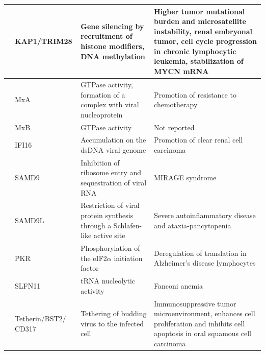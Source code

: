\documentclass{enslyonreview}
\begin{document}
\begin{table}[!t]
\begin{tabularx}{\textwidth}{|>{\justifying\parindent0pt\arraybackslash}p{2.6cm}|>{\justifying\parindent0pt\arraybackslash}p{2.7cm}|>{\justifying\parindent0pt\arraybackslash}p{3.6cm}|>{\justifying\parindent0pt\arraybackslash}X|}
      & KAP1/TRIM28 \cite{xuIFI16PartnersKAP12022,leeCharacterizationInteractionTrim282018,shangSystematicPancancerAnalysis2023,whitworthWilmsTumourResulting2024,wuPhosphoproteomicsRevealsRole2022,yangKAP1StabilizesMYCN2024} & Gene silencing by recruitment of histone modifiers, DNA methylation & Higher tumor mutational burden and microsatellite instability, renal embryonal tumor, cell cycle progression in chronic lymphocytic leukemia, stabilization of MYCN mRNA \\
      \cline{2-4}
      & MxA \cite{turanNuclearMxAProteins2004,hayesExpressionMxAEsophageal2024,liExpressionMxAProtein2020} & GTPase activity, formation of a complex with viral nucleoprotein & Promotion of resistance to chemotherapy \\
      \cline{2-4}
      & MxB \cite{xieMxBImpedesNUP358mediated2020,wangInterferoninducibleMX2Host2020,schillingHumanMxBProtein2018} & GTPase activity & Not reported \\
      \cline{2-4}
      & IFI16 \cite{luIFI16PromotesProgression2024,xuIFI16PartnersKAP12022,howardNuclearDNASensor2022,johnsonIFI16RestrictsHSV12014} & Accumulation on the dsDNA viral genome & Promotion of clear renal cell carcinoma \\
    \hline
    \multirow{4}{2.6cm}{Translation inhibition}
      & SAMD9 \cite{mengParalogousPairMammalian2018,sivanHumanHostRange2018,suntharalinghamEmergingPhenotypesLinked2022} & Inhibition of ribosome entry and sequestration of viral RNA & MIRAGE syndrome \\
      \cline{2-4}
      & SAMD9L \cite{russellSAMD9LAutoinflammatoryAtaxia2021,mengParalogousPairMammalian2018,legrandSAMD9LActsAntiviral2024} & Restriction of viral protein synthesis through a Schlafen-like active site & Severe autoinflammatory disease and ataxia-pancytopenia \\
      \cline{2-4}
      & PKR \cite{morelPKRDoubleStranded2009,manjunathAPOBEC3BDrivesPKRmediated2023} & Phosphorylation of the eIF2$\alpha$ initiation factor & Deregulation of translation in Alzheimer's disease lymphocytes \\
      \cline{2-4}
      & SLFN11 \cite{valdezSchlafen11Restricts2019,okamotoSLFN11PromotesStalled2021a} & tRNA nucleolytic activity & Fanconi anemia \\
    \hline
    \multirow{4}{2.6cm}{Direct protein-virus interaction}
      & Tetherin/BST2/ CD317 \cite{ozcanBendingBST2Coiledcoil2017,tanwattanaHumanBST2Inhibits2023,jinBST2PromotesGrowth2019,heBST2InducedMacrophage2023} & Tethering of budding virus to the infected cell & Immunosuppressive tumor microenvironment, enhances cell proliferation and inhibits cell apoptosis in oral squamous cell carcinoma \\

\end{tabularx}
\end{table}
\end{document}
